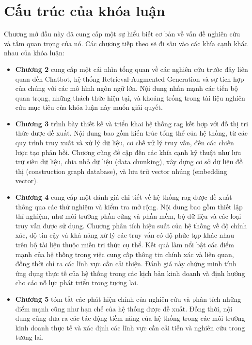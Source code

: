 \section{Cấu trúc của khóa luận}
Chương mở đầu này đã cung cấp một sự hiểu biết cơ bản về vấn đề nghiên cứu và tầm quan trọng của nó. Các chương tiếp theo sẽ đi sâu vào các khía cạnh khác nhau của khóa luận:
\begin{itemize}
    \item \textbf{Chương 2} cung cấp một cái nhìn tổng quan về các nghiên cứu trước đây liên quan đến Chatbot, hệ thống Retrieval-Augmented Generation và sự tích hợp của chúng với các mô hình ngôn ngữ lớn. Nội dung nhấn mạnh các tiến bộ quan trọng, những thách thức hiện tại, và khoảng trống trong tài liệu nghiên cứu mục tiêu của khóa luận này muốn giải quyết.
    \item \textbf{Chương 3} trình bày thiết kế và triển khai hệ thống \gls{rag} kết hợp với đồ thị tri thức được đề xuất. Nội dung bao gồm kiến trúc tổng thể của hệ thống, từ các quy trình truy xuất và xử lý dữ liệu, cơ chế xử lý truy vấn, đến các chiến lược tạo phản hồi. Chương cũng đề cập đến các khía cạnh kỹ thuật như lưu trữ siêu dữ liệu, chia nhỏ dữ liệu (data chunking), xây dựng cơ sở dữ liệu đồ thị (construction graph database), và lưu trữ vector nhúng (embedding vector).
    \item \textbf{Chương 4} cung cấp một đánh giá chi tiết về hệ thống \gls{rag} được đề xuất thông qua các thử nghiệm và kiểm tra mở rộng. Nội dung bao gồm thiết lập thí nghiệm, như môi trường phần cứng và phần mềm, bộ dữ liệu và các loại truy vấn được sử dụng. Chương phân tích hiệu suất của hệ thống về độ chính xác, độ tin cậy và khả năng xử lý các truy vấn có độ phức tạp khác nhau trên bộ tài liệu thuộc miền tri thức cụ thể. Kết quả làm nổi bật các điểm mạnh của hệ thống trong việc cung cấp thông tin chính xác và liên quan, đồng thời chỉ ra các lĩnh vực cần cải thiện. Đánh giá này chứng minh tính ứng dụng thực tế của hệ thống trong các kịch bản kinh doanh và định hướng cho các nỗ lực phát triển trong tương lai.
    \item \textbf{Chương 5} tóm tắt các phát hiện chính của nghiên cứu và phân tích những điểm mạnh cũng như hạn chế của hệ thống được đề xuất. Đồng thời, nội dung cũng đưa ra các tác động tiềm năng của hệ thống trong các môi trường kinh doanh thực tế và xác định các lĩnh vực cần cải tiến và nghiên cứu trong tương lai.
\end{itemize}